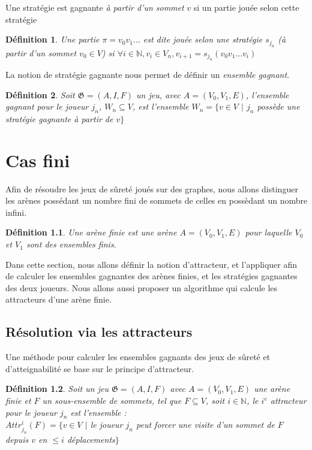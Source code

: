 \documentclass[12pt,a4paper,oneside,titlepage]{report}
\newtheorem{defi}{D\'efinition}[section]
\begin{document}
\noindent Une stratégie est gagnante \emph{à partir d'un sommet} $v$ si un partie jouée selon cette stratégie 

\begin{defi}
Une partie $\pi=v_0 v_1 ...$ est dite \emph{jouée selon une stratégie} $s_{j_n}$  (à partir d'un sommet $v_0 \in V$) si $\forall i \in \mathbb{N}, v_i \in V_n, v_{i+1} = s_{j_n}(v_0v_1...v_i)$
\end{defi}

\noindent La notion de stratégie gagnante nous permet de définir un \emph{ensemble gagnant}. 
\begin{defi}
\label{finitewinningset}
Soit $\mathfrak{G}=(A,I,F)$ un jeu, avec $A=(V_0, V_1, E)$, l'\emph{ensemble gagnant} pour le joueur $j_n$, $W_n\subseteq V$, est l'ensemble $W_n=\{v\in V$ $|$ $j_n$ possède une stratégie gagnante à partir de $v \}$
\end{defi}


\chapter{Cas fini}
\renewcommand{\leftmark}{CHAPITRE \thechapter.~~Cas fini}
Afin de résoudre les jeux de sûreté joués sur des graphes, nous allons distinguer les arènes possédant un nombre fini de sommets de celles en possèdant un nombre infini. 
\begin{defi}
Une \emph{arène finie} est une arène $A=(V_0, V_1, E)$ pour laquelle $V_0$ et $V_1$ sont des ensembles finis.
\end{defi}
\noindent Dans cette section, nous allons définir la notion d'attracteur, et l'appliquer afin de calculer les ensembles gagnantes des arènes finies, et les stratégies gagnantes des deux joueurs. Nous allons aussi proposer un algorithme qui calcule les attracteurs d'une arène finie.
\section{Résolution via les attracteurs}
Une méthode pour calculer les ensembles gagnants des jeux de sûreté et d'atteignabilité se base sur le principe d'attracteur. 
\begin{defi}
	Soit un jeu $\mathfrak{G} = (A,I,F)$ avec $A=(V_0, V_1, E)$ une arène finie et $F$ un sous-ensemble de sommets, tel que $F\subseteq V$, soit $i\in \mathbb{N}$, le $i^e$ attracteur pour le joueur $j_n$ est l'ensemble :\\
	$Attr_{j_n}^i(F)=\{v\in V$ $|$ le joueur $j_n$ peut forcer une visite d'un sommet de $F
$ depuis $v$ en $ \leq  i $ déplacements$\}$
\end{defi}
\end{document}
